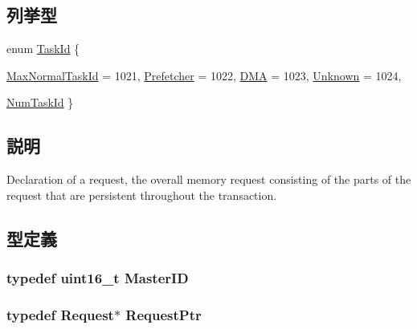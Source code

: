 \subsection*{列挙型}
\begin{DoxyCompactItemize}
\item 
enum \hyperlink{namespaceContextSwitchTaskId_aa8dd388981e62e592eb420a58ab290b7}{TaskId} \{ \par
\hyperlink{namespaceContextSwitchTaskId_aa8dd388981e62e592eb420a58ab290b7a675ac8c10b4bdb20e74ca50add8789f5}{MaxNormalTaskId} =  1021, 
\hyperlink{namespaceContextSwitchTaskId_aa8dd388981e62e592eb420a58ab290b7a9f338c28f1a3b00da1f6f2cb2982dcd0}{Prefetcher} =  1022, 
\hyperlink{namespaceContextSwitchTaskId_aa8dd388981e62e592eb420a58ab290b7a6537a62f6f155792bb9a320ee2ec4d68}{DMA} =  1023, 
\hyperlink{namespaceContextSwitchTaskId_aa8dd388981e62e592eb420a58ab290b7a4e81c184ac3ad48a389cd4454c4a05bb}{Unknown} =  1024, 
\par
\hyperlink{namespaceContextSwitchTaskId_aa8dd388981e62e592eb420a58ab290b7aed1b0e3dbb2efd4067685b0be5b03167}{NumTaskId}
 \}
\end{DoxyCompactItemize}


\subsection{説明}
Declaration of a request, the overall memory request consisting of the parts of the request that are persistent throughout the transaction. 

\subsection{型定義}
\hypertarget{request_8hh_ac366b729262fd8e7cbd3283da6f775cf}{
\subsubsection[{MasterID}]{\setlength{\rightskip}{0pt plus 5cm}typedef uint16\_\-t {\bf MasterID}}}
\label{request_8hh_ac366b729262fd8e7cbd3283da6f775cf}
\hypertarget{request_8hh_a205ab3644529411056be77e9f2abab27}{
\subsubsection[{RequestPtr}]{\setlength{\rightskip}{0pt plus 5cm}typedef {\bf Request}$\ast$ {\bf RequestPtr}}}
\label{request_8hh_a205ab3644529411056be77e9f2abab27}
